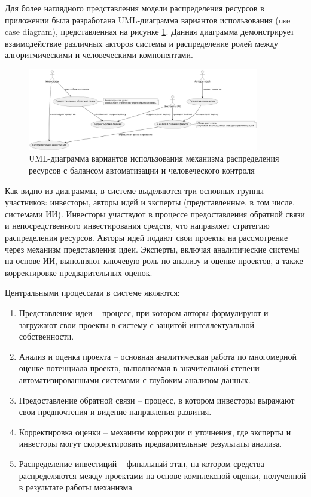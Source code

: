 \documentclass[
    14pt,
    specialist,
    candidate, %
    subf, %
    href,
    dotsinheaders=false
]{disser}
\begin{document}
Для более наглядного представления модели распределения ресурсов в приложении была разработана UML-диаграмма вариантов использования (use case diagram), представленная на рисунке \ref{fig:uml-use-case-diagram}. Данная диаграмма демонстрирует взаимодействие различных акторов системы и распределение ролей между алгоритмическими и человеческими компонентами.

\begin{figure}[ht]
  \centering
  \includegraphics[width=0.9\textwidth]{./assets/uml-use-case-diagram.png}
  \caption{UML-диаграмма вариантов использования механизма распределения ресурсов с балансом автоматизации и человеческого контроля}
  \label{fig:uml-use-case-diagram}
\end{figure}

Как видно из диаграммы, в системе выделяются три основных группы участников: инвесторы, авторы идей и эксперты (представленные, в том числе, системами ИИ). Инвесторы участвуют в процессе предоставления обратной связи и непосредственного инвестирования средств, что направляет стратегию распределения ресурсов. Авторы идей подают свои проекты на рассмотрение через механизм представления идеи. Эксперты, включая аналитические системы на основе ИИ, выполняют ключевую роль по анализу и оценке проектов, а также корректировке предварительных оценок.

Центральными процессами в системе являются:

\begin{enumerate}
  \item Представление идеи -- процесс, при котором авторы формулируют и загружают свои проекты в систему с защитой интеллектуальной собственности.

  \item Анализ и оценка проекта -- основная аналитическая работа по многомерной оценке потенциала проекта, выполняемая в значительной степени автоматизированными системами с глубоким анализом данных.

  \item Предоставление обратной связи -- процесс, в котором инвесторы выражают свои предпочтения и видение направления развития.

  \item Корректировка оценки -- механизм коррекции и уточнения, где эксперты и инвесторы могут скорректировать предварительные результаты анализа.

  \item Распределение инвестиций -- финальный этап, на котором средства распределяются между проектами на основе комплексной оценки, полученной в результате работы механизма.
\end{enumerate}
\end{document}
